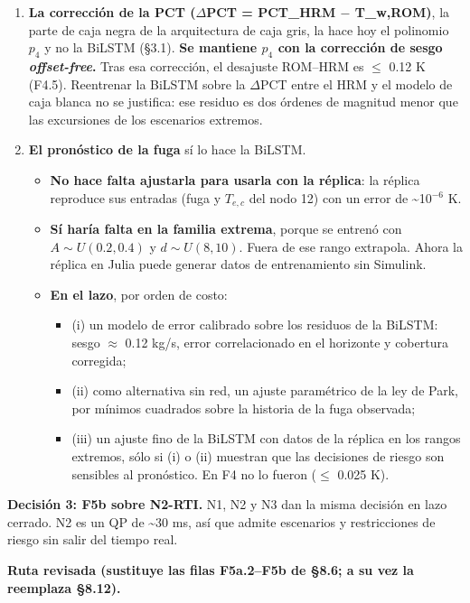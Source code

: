 \documentclass[11pt,a4paper]{article}
\begin{document}
\begin{enumerate}
\item \textbf{La corrección de la PCT ($\Delta$PCT = PCT\_HRM $-$ T\_w,ROM)}, la parte de caja negra de la arquitectura de caja gris, la hace hoy el polinomio $p_4$ y no la BiLSTM (\S{}3.1). \textbf{Se mantiene $p_4$ con la corrección de sesgo \emph{offset-free}.} Tras esa corrección, el desajuste ROM–HRM es $\le$ 0.12 K (F4.5). Reentrenar la BiLSTM sobre la $\Delta$PCT entre el HRM y el modelo de caja blanca no se justifica: ese residuo es dos órdenes de magnitud menor que las excursiones de los escenarios extremos.
\item \textbf{El pronóstico de la fuga} sí lo hace la BiLSTM.
\begin{itemize}
\item \textbf{No hace falta ajustarla para usarla con la réplica}: la réplica reproduce sus entradas (fuga y $T_{e,c}$ del nodo 12) con un error de \textasciitilde{}10$^{-6}$ K.
\item \textbf{Sí haría falta en la familia extrema}, porque se entrenó con $A\sim U(0.2,0.4)$ y $d\sim U(8,10)$. Fuera de ese rango extrapola. Ahora la réplica en Julia puede generar datos de entrenamiento sin Simulink.
\item \textbf{En el lazo}, por orden de costo:
\begin{itemize}
\item (i) un modelo de error calibrado sobre los residuos de la BiLSTM: sesgo $\approx$ 0.12 kg/s, error correlacionado en el horizonte y cobertura corregida;
\item (ii) como alternativa sin red, un ajuste paramétrico de la ley de Park, por mínimos cuadrados sobre la historia de la fuga observada;
\item (iii) un ajuste fino de la BiLSTM con datos de la réplica en los rangos extremos, sólo si (i) o (ii) muestran que las decisiones de riesgo son sensibles al pronóstico. En F4 no lo fueron ($\le$ 0.025 K).
\end{itemize}
\end{itemize}
\end{enumerate}

\textbf{Decisión 3: F5b sobre N2-RTI.} N1, N2 y N3 dan la misma decisión en lazo cerrado. N2 es un QP de \textasciitilde{}30 ms, así que admite escenarios y restricciones de riesgo sin salir del tiempo real.

\textbf{Ruta revisada (sustituye las filas F5a.2–F5b de \S{}8.6; a su vez la reemplaza \S{}8.12).}
\end{document}
